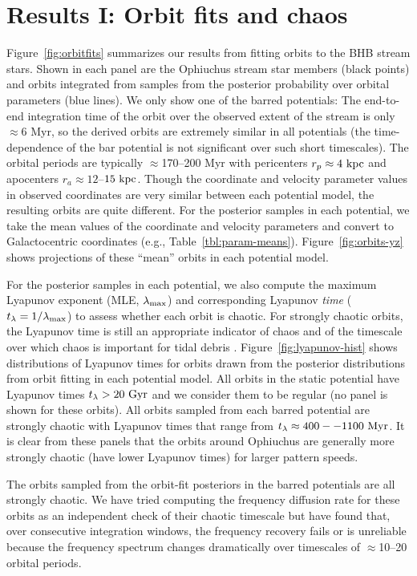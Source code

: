 \documentclass[letterpaper,12pt,preprint]{aastex}
\newcommand{\lyapexp}{\lambda_{\rm max}}
\newcommand{\lyapt}{t_\lambda}
\begin{document}
\section{Results I: Orbit fits and chaos}\label{sec:results1}

Figure~\ref{fig:orbitfits} summarizes our results from fitting orbits to the BHB stream stars. Shown in each panel are the Ophiuchus stream star members (black points) and orbits integrated from samples from the posterior probability over orbital parameters (blue lines). We only show one of the barred potentials: The end-to-end integration time of the orbit over the observed extent of the stream is only $\approx$6 Myr, so the derived orbits are extremely similar in all potentials (the time-dependence of the bar potential is not significant over such short timescales). The orbital periods are typically $\approx$170--200 Myr with pericenters $r_p \approx 4~{\rm kpc}$ and apocenters $r_a \approx 12$--$15~{\rm kpc}$. Though the coordinate and velocity parameter values in observed coordinates are very similar between each potential model, the resulting orbits are quite different. For the posterior samples in each potential, we take the mean values of the coordinate and velocity parameters and convert to Galactocentric coordinates (e.g., Table~\ref{tbl:param-means}). Figure~\ref{fig:orbits-yz} shows projections of these ``mean'' orbits in each potential model.

For the posterior samples in each potential, we also compute the maximum Lyapunov exponent (MLE, $\lyapexp$) and corresponding Lyapunov \emph{time} ($\lyapt = 1/\lyapexp$) to assess whether each orbit is chaotic. For strongly chaotic orbits, the Lyapunov time is still an appropriate indicator of chaos and of the timescale over which chaos is important for tidal debris \citep{apw15-chaos}. Figure~\ref{fig:lyapunov-hist} shows distributions of Lyapunov times for orbits drawn from the posterior distributions from orbit fitting in each potential model. All orbits in the static potential have Lyapunov times $\lyapt > 20~{\rm Gyr}$ and we consider them to be regular (no panel is shown for these orbits). All orbits sampled from each barred potential are strongly chaotic with Lyapunov times that range from $\lyapt \approx 400--1100~{\rm Myr}$. It is clear from these panels that the orbits around Ophiuchus are generally more strongly chaotic (have lower Lyapunov times) for larger pattern speeds. 

The orbits sampled from the orbit-fit posteriors in the barred potentials are all strongly chaotic. We have tried computing the frequency diffusion rate for these orbits as an independent check of their chaotic timescale but have found that, over consecutive integration windows, the frequency recovery fails or is unreliable because the frequency spectrum changes dramatically over timescales of $\approx$10--20 orbital periods. 
\end{document}
